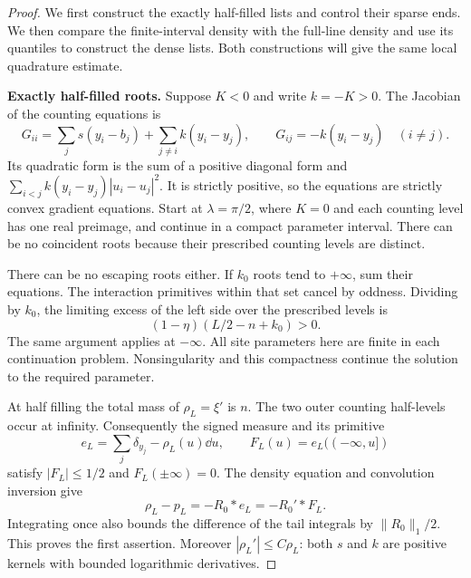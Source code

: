 \begin{proof}
We first construct the exactly half-filled lists and control their
sparse ends. We then compare the finite-interval density with the
full-line density and use its quantiles to construct the dense lists.
Both constructions will give the same local quadrature estimate.

\smallskip\noindent\textbf{Exactly half-filled roots.}
Suppose $K<0$ and write $k=-K>0$.  The Jacobian of the
counting equations is
\[
 G_{ii}=\sum_j s(y_i-b_j)+\sum_{j\ne i}k(y_i-y_j),
 \qquad G_{ij}=-k(y_i-y_j)\quad(i\ne j).
\]
Its quadratic form is the sum of a positive diagonal form and
$\sum_{i<j}k(y_i-y_j)|u_i-u_j|^2$.  It is strictly positive,
so the equations are strictly convex gradient equations.
Start at $\lambda=\pi/2$, where $K=0$ and each counting level has
one real preimage, and continue in a compact parameter interval.
There can be no coincident roots because their prescribed counting
levels are distinct.

There can be no escaping roots either.  If $k_0$ roots tend to
$+\infty$, sum their equations.  The interaction primitives within
that set cancel by oddness.  Dividing by $k_0$, the limiting excess
of the left side over the prescribed levels is
\[
 (1-\eta)(L/2-n+k_0)>0.
\]
The same argument applies at $-\infty$.  All site parameters here
are finite in each continuation problem.  Nonsingularity and this
compactness continue the solution to the required parameter.

At half filling the total mass of $\rho_L=\xi'$ is $n$.
The two outer counting half-levels occur at infinity.  Consequently
the signed measure and its primitive
\[
 e_L=\sum_j\delta_{y_j}-\rho_L(u)\dd u,\qquad
 F_L(u)=e_L((-\infty,u])
\]
satisfy $|F_L|\le1/2$ and $F_L(\pm\infty)=0$.
The density equation and convolution inversion give
\begin{equation}\label{eq:counting-sawtooth}
 \rho_L-p_L=-R_0*e_L=-R_0'*F_L.
\end{equation}
Integrating once also bounds the difference of the tail integrals
by $\|R_0\|_1/2$.  This proves the first assertion.  Moreover
$|\rho_L'|\le C\rho_L$: both $s$ and $k$ are positive kernels
with bounded logarithmic derivatives.


\end{proof}
